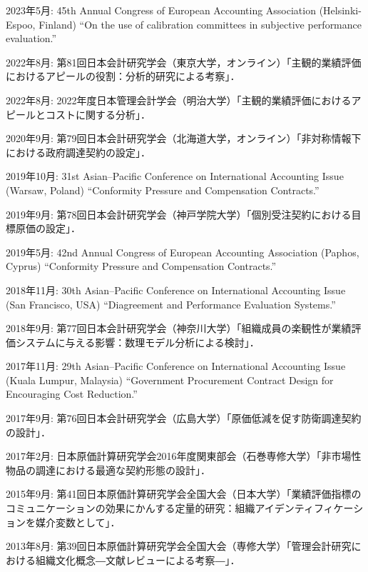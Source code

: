 \documentclass[letterpaper,uplatex]{article}
\renewenvironment{itemize}{
  \begin{list}{}{
    \setlength{\leftmargin}{1.5em}
  }
}{
  \end{list}
}
\begin{document}
\begin{itemize}
    \item 2023年5月: 45th Annual Congress of European Accounting Association (Helsinki-Espoo, Finland) ``On the use of calibration committees in subjective performance evaluation.''
    
    \item 2022年8月: 第81回日本会計研究学会（東京大学，オンライン）「主観的業績評価におけるアピールの役割：分析的研究による考察」．
    
    \item 2022年8月: 2022年度日本管理会計学会（明治大学）「主観的業績評価におけるアピールとコストに関する分析」．

  \item 2020年9月: 第79回日本会計研究学会（北海道大学，オンライン）「非対称情報下における政府調達契約の設定」．
  
  \item 2019年10月: 31st Asian--Pacific Conference on International Accounting Issue (Warsaw, Poland) ``Conformity Pressure and Compensation Contracts.''

  \item 2019年9月: 第78回日本会計研究学会（神戸学院大学）「個別受注契約における目標原価の設定」．

  \item 2019年5月: 42nd Annual Congress of European Accounting Association (Paphos, Cyprus) ``Conformity Pressure and Compensation Contracts.''

  \item 2018年11月: 30th Asian--Pacific Conference on International Accounting Issue (San Francisco, USA) ``Diagreement and Performance Evaluation Systems.''

  \item 2018年9月: 第77回日本会計研究学会（神奈川大学）「組織成員の楽観性が業績評価システムに与える影響：数理モデル分析による検討」．

	\item 2017年11月: 29th Asian--Pacific Conference on International Accounting Issue (Kuala Lumpur, Malaysia) ``Government Procurement Contract Design for Encouraging Cost Reduction.''

	\item 2017年9月: 第76回日本会計研究学会（広島大学）「原価低減を促す防衛調達契約の設計」．

	\item 2017年2月: 日本原価計算研究学会2016年度関東部会（石巻専修大学）「非市場性物品の調達における最適な契約形態の設計」．

	\item 2015年9月: 第41回日本原価計算研究学会全国大会（日本大学）「業績評価指標のコミュニケーションの効果にかんする定量的研究：組織アイデンティフィケーションを媒介変数として」．

	\item 2013年8月: 第39回日本原価計算研究学会全国大会（専修大学）「管理会計研究における組織文化概念―文献レビューによる考察―」．
\end{itemize}
\end{document}
